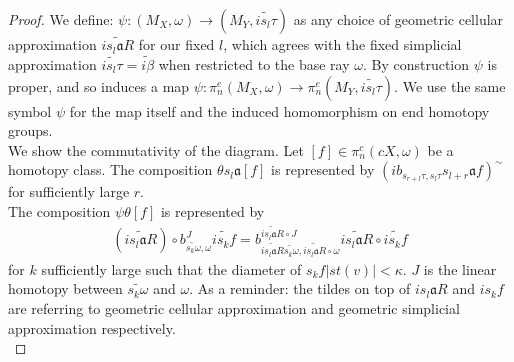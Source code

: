 \documentclass[a4paper,11pt]{article}
\theoremstyle{definition}
\theoremstyle{plain}
\theoremstyle{remark}
\begin{document}
{\begin{proof}
We define: $\psi: (M_X,\omega) \rightarrow (M_Y,\widetilde{is_{l}\tau})$ as any choice of geometric cellular approximation $\widetilde{is_{l}\mathfrak{a}R}$ for our fixed $l$, which agrees with the fixed simplicial approximation $\widetilde{is_{l}\tau} = \widetilde{i\beta}$ when restricted to the base ray $\omega$. By construction $\psi$ is proper, and so induces a map $\psi: \pi_{n}^{e}(M_X,\omega)\rightarrow \pi_{n}^{e}(M_{Y},\widetilde{is_{l}\tau})$. We use the same symbol $\psi$ for the map itself and the induced homomorphism on end homotopy groups.\\ 


We show the commutativity of the diagram. Let $[f]\in \pi_{n}^{c}(cX,\omega)$ be a homotopy class. The composition $\theta s_{l} \mathfrak{a}[f]$ is represented by $(ib_{s_{r+l}\tau,s_{l}\tau}s_{l+r}\mathfrak{a}f)^{\sim}$ for sufficiently large $r$. \\

The composition $\psi \theta [f]$ is represented by 
\begin{align*}
(\widetilde{i  s_{l}\mathfrak{a} R})\circ  b^{J}_{\widetilde{s_{k}\omega},\omega} \widetilde{is_{k} f} = b^{\widetilde{i  s_{l}\mathfrak{a} R} \circ J}_{\widetilde{i  s_{l}\mathfrak{a} R} \widetilde{s_{k}\omega},\widetilde{i  s_{l}\mathfrak{a} R} \circ \omega}\widetilde{i  s_{l}\mathfrak{a} R} \circ \widetilde{i s_{k} f}
\end{align*}
for $k$ sufficiently large such that the diameter of $s_{k}f|st(v)|<\kappa$. $J$ is the linear homotopy between $\widetilde{s_{k}\omega}$ and $\omega$. As a reminder: the tildes on top of $is_{l}\mathfrak{a}R$ and $is_{k}f$ are referring to geometric cellular approximation and geometric simplicial approximation respectively.\\


\end{proof}}
\end{document}

